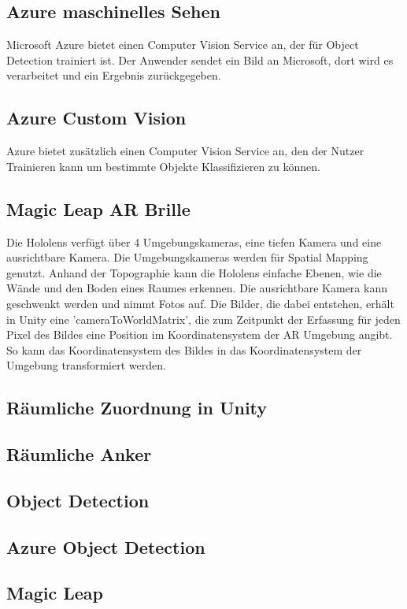 \documentclass[german,a4paper, 12pt]{llncs}
\begin{document}
\subsection*{Azure maschinelles Sehen}
Microsoft Azure bietet einen Computer Vision Service an, der für Object Detection trainiert ist.
Der Anwender sendet ein Bild an Microsoft, dort wird es verarbeitet und ein Ergebnis zurückgegeben.\cite{getAzure,whatIsAzure,objDetectAzure,Azure302Doc}

\subsection*{Azure Custom Vision}
Azure bietet zusätzlich einen Computer Vision Service an, den der Nutzer Trainieren kann um bestimmte Objekte Klassifizieren zu können.\cite{Azure302bDoc}

\subsection*{Magic Leap AR Brille}
Die Hololens verfügt über 4 Umgebungskameras, eine tiefen Kamera und eine  ausrichtbare Kamera. Die Umgebungskameras werden für Spatial Mapping genutzt. Anhand der Topographie kann die Hololens einfache Ebenen, wie die Wände und den Boden eines Raumes erkennen. Die ausrichtbare Kamera kann geschwenkt werden und nimmt Fotos auf. Die Bilder, die dabei entstehen, erhält in Unity eine 'cameraToWorldMatrix', die zum Zeitpunkt der Erfassung für jeden Pixel des Bildes eine Position im Koordinatensystem der AR Umgebung angibt. So kann das Koordinatensystem des Bildes in das Koordinatensystem der Umgebung transformiert werden.\cite{locatableCamera}


\subsection{Räumliche Zuordnung in Unity}
\subsection{Räumliche Anker}
\subsection{Object Detection}
\subsection{Azure Object Detection}
\subsection{Magic Leap}
\end{document}
